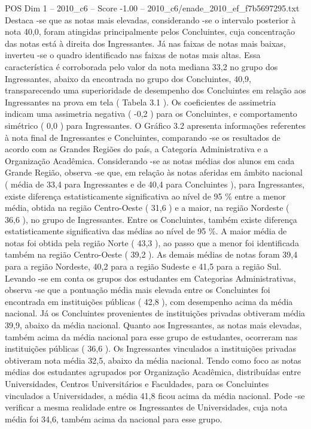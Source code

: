\begin{textsample}{POS Dim 1 – 2010\_c6 – Score -1.00 – 2010\_c6/enade\_2010\_ef\_f7b5697295.txt}
Destaca -se que as notas mais elevadas, considerando -se o intervalo posterior à nota 40,0, foram atingidas principalmente pelos Concluintes, cuja concentração das notas está à direita dos Ingressantes.
Já nas faixas de notas mais baixas, inverteu -se o quadro identificado nas faixas de notas mais altas.
Essa característica é corroborada pelo valor da nota mediana 33,2 no grupo dos Ingressantes, abaixo da encontrada no grupo dos Concluintes, 40,9, transparecendo uma superioridade de desempenho dos Concluintes em relação aos Ingressantes na prova em tela ( Tabela 3.1 ).
Os coeficientes de assimetria indicam uma assimetria negativa ( -0,2 ) para os Concluintes, e comportamento simétrico ( 0,0 ) para Ingressantes.
O Gráfico 3.2 apresenta informações referentes à nota final de Ingressantes e Concluintes, comparando -se os resultados de acordo com as Grandes Regiões do país, a Categoria Administrativa e a Organização Acadêmica.
Considerando -se as notas médias dos alunos em cada Grande Região, observa -se que, em relação às notas aferidas em âmbito nacional ( média de 33,4 para Ingressantes e de 40,4 para Concluintes ), para Ingressantes, existe diferença estatisticamente significativa ao nível de 95 \% entre a menor média, obtida na região Centro-Oeste ( 31,6 ) e a maior, na região Nordeste ( 36,6 ), no grupo de Ingressantes.
Entre os Concluintes, também existe diferença estatisticamente significativa das médias ao nível de 95 \%.
A maior média de notas foi obtida pela região Norte ( 43,3 ), ao passo que a menor foi identificada também na região Centro-Oeste ( 39,2 ).
As demais médias de notas foram 39,4 para a região Nordeste, 40,2 para a região Sudeste e 41,5 para a região Sul.
Levando -se em conta os grupos dos estudantes em Categorias Administrativas, observa -se que a pontuação média mais elevada entre os Concluintes foi encontrada em instituições públicas ( 42,8 ), com desempenho acima da média nacional.
Já os Concluintes provenientes de instituições privadas obtiveram média 39,9, abaixo da média nacional.
Quanto aos Ingressantes, as notas mais elevadas, também acima da média nacional para esse grupo de estudantes, ocorreram nas instituições públicas ( 36,6 ).
Os Ingressantes vinculados a instituições privadas obtiveram nota média 32,5, abaixo da média nacional.
Tendo como foco as notas médias dos estudantes agrupados por Organização Acadêmica, distribuídas entre Universidades, Centros Universitários e Faculdades, para os Concluintes vinculados a Universidades, a média 41,8 ficou acima da média nacional.
Pode -se verificar a mesma realidade entre os Ingressantes de Universidades, cuja nota média foi 34,6, também acima da nacional para esse grupo.

\end{textsample}
